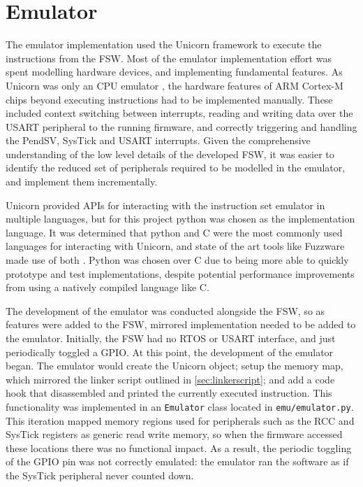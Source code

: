 \documentclass[../report.tex]{subfiles}
\begin{document}
\section{Emulator}


The emulator implementation used the Unicorn framework \citep{Unicorn} to execute the
instructions from the FSW. Most of the emulator implementation effort was spent
modelling hardware devices, and implementing fundamental features. As Unicorn
was only an CPU emulator \citep{Unicorn}, the hardware features of ARM Cortex-M
chips beyond executing instructions had to be implemented manually. These
included context switching between interrupts, reading and writing data over
the USART peripheral to the running firmware, and correctly triggering and
handling the PendSV, SysTick and USART interrupts. Given the comprehensive
understanding of the low level details of the developed FSW, it was easier to
identify the reduced set of peripherals required to be modelled in the
emulator, and implement them incrementally.

Unicorn provided APIs for interacting with the instruction set emulator in
multiple languages, but for this project python was chosen as the
implementation language. It was determined that python and C were the most
commonly used languages for interacting with Unicorn, and state of the art
tools like Fuzzware made use of both \citep{Fuzzware_2022}. Python was chosen
over C due to being more able to quickly prototype and test implementations,
despite potential performance improvements from using a natively compiled
language like C.

The development of the emulator was conducted alongside the FSW, so as features
were added to the FSW, mirrored implementation needed to be added to the
emulator. Initially, the FSW had no RTOS or USART interface, and just
periodically toggled a GPIO. At this point, the development of the emulator
began. The emulator would create the Unicorn object; setup the memory map,
which mirrored the linker script outlined in \autoref{sec:linkerscript}; and
add a code hook that disassembled and printed the currently executed
instruction. This functionality was implemented in an \lstinline|Emulator|
class located in \lstinline|emu/emulator.py|.
This iteration mapped memory regions used for peripherals such as
the RCC and SysTick registers as generic read write memory, so when the
firmware accessed these locations there was no functional impact. As a result,
the periodic toggling of the GPIO pin was not correctly emulated: the emulator
ran the software as if the SysTick peripheral never counted down.
\end{document}
